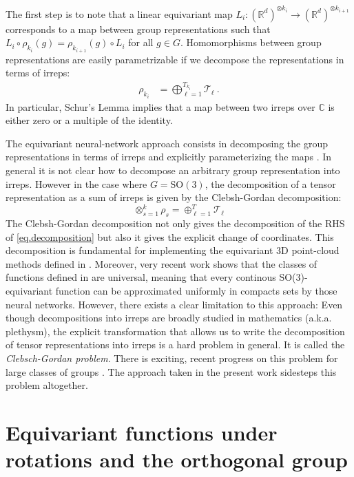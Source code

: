\documentclass{article}
\theoremstyle{Hogg}
\begin{document}
The first step is to note that a linear equivariant map $  L_i: (\mathbb R^d)^{\otimes k_i} \to (\mathbb R^d)^{\otimes k_{i+1}}$ corresponds to a map between group representations such that $  L_i \circ \rho_{k_i}(g) = \rho_{k_{i+1}}(g)\circ   L_i$ for all $g\in G$.
Homomorphisms between group representations are easily parametrizable if we decompose the representations in terms of irreps: 
\begin{align}
\rho_{k_i} &= \bigoplus_{\ell=1}^{T_{k_i}} \mathcal T_{\ell} ~.
\end{align}
In particular, Schur's Lemma implies that a map between two irreps over $\mathbb C$ is either zero or a multiple of the identity. 

The equivariant neural-network approach consists in decomposing the group representations in terms of irreps and explicitly parameterizing the maps \cite{kondor2018n, thomas2018tensor, fuchs2020se}.
In general it is not clear how to decompose an arbitrary group representation into irreps. However in the case where $G=\text{SO}(3)$, the decomposition of a tensor representation as a sum of irreps is given by the Clebsh-Gordan decomposition: \begin{equation}
 {\otimes_{s=1}^k \rho_s}= \oplus_{\ell=1}^{T} \mathcal T_{\ell} \label{eq.decomposition}
\end{equation}
The Clebsh-Gordan decomposition not only gives the decomposition of the RHS of \eqref{eq.decomposition} but also it gives the explicit change of coordinates. This decomposition is fundamental for implementing the equivariant 3D point-cloud methods defined in \cite{fuchs2020se, thomas2018tensor, bogatskiy2020lorentz}. 
Moreover, very recent work \cite{dym2020universality} shows that the classes of functions defined in \cite{fuchs2020se, thomas2018tensor} are universal, meaning that every continous SO(3)-equivariant function can be approximated uniformly in compacts sets by those neural networks. 
However, there exists a clear limitation to this approach: Even though decompositions into irreps are broadly studied in mathematics (a.k.a. plethysm), the explicit transformation that allows us to write the decomposition of tensor representations into irreps is a hard problem in general. It is called the {\em Clebsch-Gordan problem}. There is exciting, recent progress on this problem for large classes of groups \cite{alex2011numerical, ibort2017new}. The approach taken in the present work sidesteps this problem altogether.

\section{Equivariant functions under rotations and the orthogonal group} \label{app.od}
\end{document}
